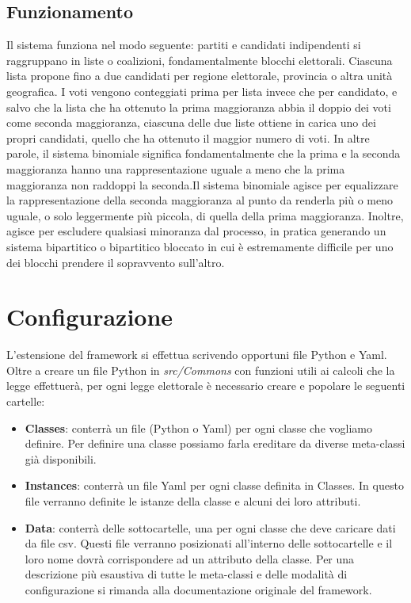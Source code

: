 \documentclass{article}
\begin{document}
\subsection{Funzionamento}
Il sistema funziona nel modo seguente: partiti e candidati indipendenti si raggruppano in liste o coalizioni, fondamentalmente blocchi elettorali. Ciascuna lista propone fino a due candidati per regione elettorale, provincia o altra unità geografica. \newline I voti vengono conteggiati prima per lista invece che per candidato, e salvo che la lista che ha ottenuto la prima maggioranza abbia il doppio dei voti come seconda maggioranza, ciascuna delle due liste ottiene in carica uno dei propri candidati, quello che ha ottenuto il maggior numero di voti. In altre parole, il sistema binomiale significa fondamentalmente che la prima e la seconda maggioranza hanno una rappresentazione uguale a meno che la prima maggioranza non raddoppi la seconda.\newline Il sistema binomiale agisce per equalizzare la rappresentazione della seconda maggioranza al punto da renderla più o meno uguale, o solo leggermente più piccola, di quella della prima maggioranza. Inoltre, agisce per escludere qualsiasi minoranza dal processo, in pratica generando un sistema bipartitico o bipartitico bloccato in cui è estremamente difficile per uno dei blocchi prendere il sopravvento sull'altro.



\section{Configurazione}
L'estensione del framework si effettua scrivendo opportuni file Python e Yaml. Oltre a creare un file Python in \textit{src/Commons} con funzioni utili ai calcoli che la legge effettuerà, per ogni legge elettorale è
necessario creare e popolare le seguenti cartelle:

\begin{itemize}
\item\textbf{Classes}: conterrà un file (Python o Yaml) per ogni classe che vogliamo definire. Per definire una classe possiamo farla ereditare da diverse meta-classi già disponibili.
\item  \textbf{Instances}: conterrà un file Yaml per ogni classe definita in Classes. In questo file verranno definite le istanze della classe e alcuni dei loro attributi.
\item \textbf{Data}: conterrà delle sottocartelle, una per ogni classe che deve caricare dati da file csv. Questi file verranno posizionati all'interno delle sottocartelle e il loro nome dovrà corrispondere ad un
attributo della classe.
Per una descrizione più esaustiva di tutte le meta-classi e delle modalità di configurazione si rimanda alla documentazione originale del framework.
\end{itemize}
\end{document}
